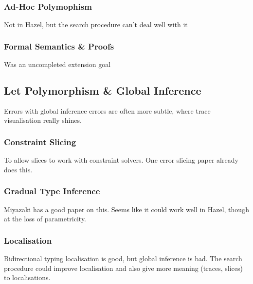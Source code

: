 \subsubsection{Ad-Hoc Polymophism}
Not in Hazel, but the search procedure can't deal well with it
\subsubsection{Formal Semantics \& Proofs}
Was an uncompleted extension goal

\subsection{Let Polymorphism \& Global Inference}
Errors with global inference errors are often more subtle, where trace visualisation really shines. 
\subsubsection{Constraint Slicing}
To allow slices to work with constraint solvers. One error slicing paper already does this.

\subsubsection{Gradual Type Inference}
Miyazaki has a good paper on this. Seems like it could work well in Hazel, though at the loss of parametricity.

\subsubsection{Localisation}
Bidirectional typing localisation is good, but global inference is bad. The search procedure could improve localisation and also give more meaning (traces, slices) to localisations.
